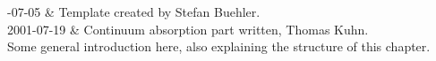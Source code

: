 %
%
 \label{sec:absorption}


%
%
-07-05 & Template created by Stefan Buehler.\\
  2001-07-19 & Continuum absorption part written, Thomas Kuhn.\\
\stophistory
%
%
%
%
%
Some general introduction here, also explaining the structure of this chapter.
%
%
%
%
\def\imn{{N''}}
\def\ime{\epsilon''}
\def\ree{\epsilon'}
%
\def\bek{\sf b_{\sf 1,k}}
\def\bzk{\sf b_{\sf 2,k}}
\def\bdk{\sf b_{\sf 3,k}}
\def\bvk{\sf b_{\sf 4,k}}
\def\bfk{\sf b_{\sf 5,k}}
\def\bsk{\sf b_{\sf 6,k}}
%
\def\bekp{\sf \widehat{b}_{\sf 1,k}}
\def\bzkp{\sf \widehat{b}_{\sf 2,k}}
\def\bdkp{\sf \widehat{b}_{\sf 3,k}}
\def\bvkp{\sf \widehat{b}_{\sf 4,k}}
\def\bfkp{\sf \widehat{b}_{\sf 5,k}}
\def\bskp{\sf \widehat{b}_{\sf 6,k}}
%
\def\beks{\sf b^*_{\sf 1}}
\def\bzks{\sf b^*_{\sf 2}}
\def\bdks{\sf b^*_{\sf 3}}
\def\bvks{\sf b^*_{\sf 4}}
\def\bfks{\sf b^*_{\sf 5}}
\def\bsks{\sf b^*_{\sf 6}}
%
\def\bekps{\sf \widehat{b^*}_{\sf 1,k}}
\def\bzkps{\sf \widehat{b^*}_{\sf 2,k}}
\def\bdkps{\sf \widehat{b^*}_{\sf 3,k}}
\def\bvkps{\sf \widehat{b^*}_{\sf 4,k}}
\def\bfkps{\sf \widehat{b^*}_{\sf 5,k}}
\def\bskps{\sf \widehat{b^*}_{\sf 6,k}}
%
\def\air{\mbox{air}}
\def\hzo{\mbox{H}_2\mbox{O}}
\def\nzo{\mbox{N}_2\mbox{O}}
\def\coz{\mbox{C}\mbox{O}_2}
\def\nz{\mbox{N}_2}
\def\oz{\mbox{O}_2}
\def\coz{\mbox{CO}_2}
%
\def\ptot{P_{\mbox{\tiny \sf tot}}}
\def\phzo{P_{\mbox{\tiny \sf H}_{2}\mbox{\tiny \sf O}}}
\def\pda{P_{\mbox{\tiny \sf d}}}
\def\pdair{P_{\mbox{\tiny \sf air}}}
\def\pan{P_{\mbox{\tiny \sf air},\mbox{\tiny \sf N}_{2}}}
\def\pcoz{P_{\mbox{\tiny \sf CO}_{2}}}
